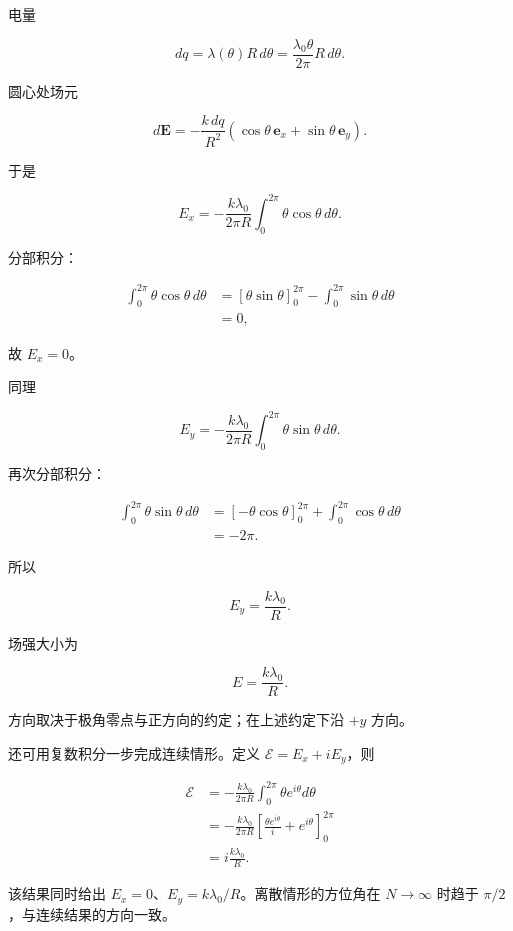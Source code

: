 \documentclass[12pt,a4paper,UTF8]{ctexart}
\begin{document}
电量

\[
dq=\lambda(\theta)R\,d\theta
=\frac{\lambda_0\theta}{2\pi}R\,d\theta.
\tag{10}
\]

圆心处场元

\[
d\boldsymbol E
=-\frac{k\,dq}{R^2}
(\cos\theta\,\boldsymbol e_x+\sin\theta\,\boldsymbol e_y).
\tag{11}
\]

于是

\[
E_x
=-\frac{k\lambda_0}{2\pi R}
\int_0^{2\pi}\theta\cos\theta\,d\theta.
\tag{12}
\]

分部积分：

\[
\begin{aligned}
\int_0^{2\pi}\theta\cos\theta\,d\theta
&=\left[\theta\sin\theta\right]_0^{2\pi}
-\int_0^{2\pi}\sin\theta\,d\theta\\
&=0,
\end{aligned}
\tag{13}
\]

故 \(E_x=0\)。

同理

\[
E_y
=-\frac{k\lambda_0}{2\pi R}
\int_0^{2\pi}\theta\sin\theta\,d\theta.
\tag{14}
\]

再次分部积分：

\[
\begin{aligned}
\int_0^{2\pi}\theta\sin\theta\,d\theta
&=\left[-\theta\cos\theta\right]_0^{2\pi}
+\int_0^{2\pi}\cos\theta\,d\theta\\
&=-2\pi.
\end{aligned}
\tag{15}
\]

所以

\[
E_y=\frac{k\lambda_0}{R}.
\tag{16}
\]

场强大小为

\[
\boxed{E=\frac{k\lambda_0}{R}}.
\tag{17}
\]

方向取决于极角零点与正方向的约定；在上述约定下沿 \(+y\) 方向。

还可用复数积分一步完成连续情形。定义 \(\mathcal E=E_x+iE_y\)，则

\[
\begin{aligned}
\mathcal E
&=-\frac{k\lambda_0}{2\pi R}
\int_0^{2\pi}\theta e^{i\theta}d\theta\\
&=-\frac{k\lambda_0}{2\pi R}
\left[
\frac{\theta e^{i\theta}}i+e^{i\theta}
\right]_0^{2\pi}\\
&=i\frac{k\lambda_0}{R}.
\end{aligned}
\]

该结果同时给出 \(E_x=0\)、\(E_y=k\lambda_0/R\)。离散情形的方位角在
\(N\to\infty\) 时趋于 \(\pi/2\)，与连续结果的方向一致。
\end{document}
